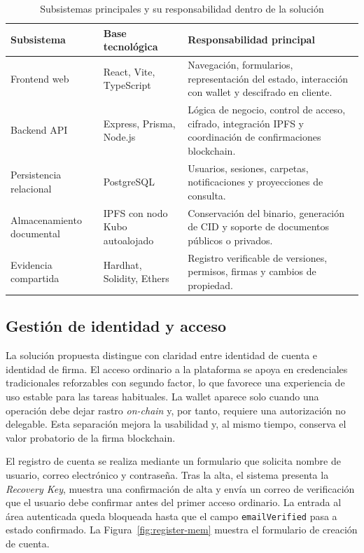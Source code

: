 \documentclass[11pt, a4paper]{article}
\begin{document}
\begin{table}[H]
    \centering
    \small
    \begin{tabular}{|p{3.3cm}|p{3.9cm}|p{6.5cm}|}
    \hline
    \textbf{Subsistema} & \textbf{Base tecnológica} & \textbf{Responsabilidad principal} \\
    \hline
    Frontend web & React, Vite, TypeScript & Navegación, formularios, representación del estado, interacción con wallet y descifrado en cliente. \\
    \hline
    Backend API & Express, Prisma, Node.js & Lógica de negocio, control de acceso, cifrado, integración IPFS y coordinación de confirmaciones blockchain. \\
    \hline
    Persistencia relacional & PostgreSQL & Usuarios, sesiones, carpetas, notificaciones y proyecciones de consulta. \\
    \hline
    Almacenamiento documental & IPFS con nodo Kubo autoalojado & Conservación del binario, generación de CID y soporte de documentos públicos o privados. \\
    \hline
    Evidencia compartida & Hardhat, Solidity, Ethers & Registro verificable de versiones, permisos, firmas y cambios de propiedad. \\
    \hline
    \end{tabular}
    \caption{Subsistemas principales y su responsabilidad dentro de la solución}
    \label{tab:subsistemas-solucion}
\end{table}

\subsection{Gestión de identidad y acceso}

La solución propuesta distingue con claridad entre identidad de cuenta e identidad de firma. El acceso ordinario a la plataforma se apoya en credenciales tradicionales reforzables con segundo factor, lo que favorece una experiencia de uso estable para las tareas habituales. La wallet aparece solo cuando una operación debe dejar rastro \textit{on-chain} y, por tanto, requiere una autorización no delegable. Esta separación mejora la usabilidad y, al mismo tiempo, conserva el valor probatorio de la firma blockchain.

El registro de cuenta se realiza mediante un formulario que solicita nombre de usuario, correo electrónico y contraseña. Tras la alta, el sistema presenta la \textit{Recovery Key}, muestra una confirmación de alta y envía un correo de verificación que el usuario debe confirmar antes del primer acceso ordinario. La entrada al área autenticada queda bloqueada hasta que el campo \texttt{emailVerified} pasa a estado confirmado. La Figura~\ref{fig:register-mem} muestra el formulario de creación de cuenta.
\end{document}

